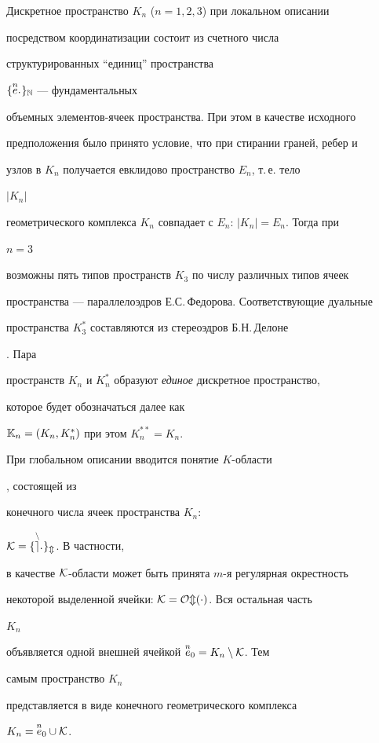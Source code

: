 


Дискретное пространство $K_n$ ($n=1,2,3$) при локальном описании 


посредством координатизации \cite{Yak1} состоит из счетного числа 


структурированных ``единиц'' пространства 


$\{\overset{n}{e}{}{}_{\textstyle\cdot}\}_{\Bbb N}$ --- фундаментальных 


объемных элементов-ячеек пространства. При этом в качестве исходного 


предположения было принято условие, что при стирании граней, ребер и 


узлов в $K_n$ получается евклидово пространство $E_n$, т.\,е. тело 


$|K_n|$ 


геометрического комплекса $K_n$ совпадает с $E_n$: $|K_n|=E_n$. Тогда при 


$n=3$ 


возможны пять типов пространств $K_3$ по числу различных типов ячеек 


пространства --- параллелоэдров Е.С.\,Федорова. Соответствующие дуальные 


пространства $K^*_3$ составляются из стереоэдров Б.Н.\,Делоне 


\cite{Yak1}. Пара 


пространств $K_n$ и $K^*_n$ образуют {\em единое} дискретное пространство, 


которое будет обозначаться далее как 


$\Bbb K_n=(K_n,K^*_n)$ при этом $K^{**}_n=K_n$. 


При глобальном описании вводится понятие $K$-области 


\cite{Yak1}, состоящей из 


конечного числа ячеек пространства $K_n$: 


$\cal K=\{\overset{n}{e}{}{}_{\textstyle\cdot}\}_m$. В частности, 


в качестве $\cal K$-области может быть принята $m$-я регулярная окрестность 


некоторой выделенной ячейки: $\cal K=Om(\cdot)$. Вся остальная часть 


$K_n$ 


объявляется одной внешней ячейкой $\overset{n}{e}{}_0=K_n\setminus\cal K$. Тем 


самым пространство $K_n$ 


представляется в виде конечного геометрического комплекса 


$K_n=\overset{n}{e}{}_0\cup\cal K$. 


